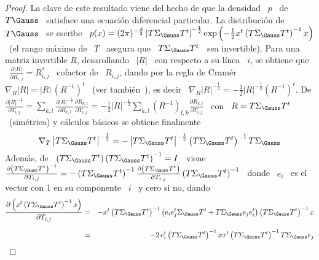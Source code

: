 \begin{proof}
  La clave de este resultado viene del hecho  de que la densidad \ $p$ \ de \ $T
  \Gauss$ \ satisface una ecuaci\'on diferencial particular.
  La   distribuci\'on  de   \  $T   \Gauss$   \  se   escribe  \   $p(x)  =   (2
  \pi)^{-\frac{d}{2}} \left| T \Sigma_\Gauss T^t \right|^{-\frac12} \exp\left( -
    \frac12 x^t \left(  T \Sigma_\Gauss T^t \right)^{-1} x  \right)$ \ (el rango
  m\'aximo de  \ $T$ \  asegura que \  $T \Sigma_\Gauss T^t$ \  sea invertible).
  Para una matriz invertible $R$, desarollando \ $|R|$ \ con respecto a su l\'inea
  \ $i$, se obtiene que  \ $\frac{\partial |R|}{\partial R_{i,j}} = R_{i,j}^*$ \
  cofactor de \ $R_{i,j}$, dando por la  regla de Cram\'er \ $\nabla_R |R| = |R|
  \, \left( R^{-1} \right)^t$ \ (ver tambi\'en~\cite[cap.~1~\&~9]{MagNeu99}), es
  decir  \  $\nabla_R |R|^{-\frac12}  =  -\frac12  |R|^{-\frac12} \left(  R^{-1}
  \right)^t$.  De $\frac{\partial |R|^{-\frac12}}{\partial T_{i,j}} = \sum_{k,l}
  \frac{\partial      |R|^{-\frac12}}{\partial      R_{k,l}}      \frac{\partial
    R_{k,l}}{\partial  T_{i,j}}  =  -\frac12  |R|^{-\frac12}  \sum_{k,l}  \left(
    R^{-1} \right)_{l,k} \frac{\partial R_{k,l}}{\partial T_{i,j}}$ \ con \ $R =
  T  \Sigma_\Gauss  T^t$  \  (sim\'etrica)  y c\'alculos  b\'asicos  se  obtiene
  finalmente
  \[
  \nabla_T  \left|   T  \Sigma_\Gauss  T^t  \right|^{-\frac12}  =   -  \left|  T
    \Sigma_\Gauss T^t \right|^{-\frac12} \left( T \Sigma_\Gauss T^t \right)^{-1}
  T \Sigma_\Gauss
  \]
  Adem\'as, de \ $\left( T  \Sigma_\Gauss T^t \right) \left( T \Sigma_\Gauss T^t
  \right)^{-1}  =  I$ \  viene  \  $\frac{\partial  \left( T  \Sigma_\Gauss  T^t
    \right)^{-1}}{\partial T_{i,j}} = -  \left( T \Sigma_\Gauss T^t \right)^{-1}
  \frac{\partial \left( T \Sigma_\Gauss  T^t \right)}{\partial T_{i,j}} \left( T
    \Sigma_\Gauss T^t \right)^{-1}$ \  donde \ $e_i$ \ es el vector  con 1 en su
  componente \ $i$ \ y cero si no, dando
  \begin{eqnarray*}
  \frac{\partial \left( x^t \left( T \Sigma_\Gauss T^t \right)^{-1} x
  \right)}{\partial T_{i,j}} & = & - x^t \left( T \Sigma_\Gauss T^t \right)^{-1}
  \left( e_i e_j^t \Sigma_\Gauss T^t + T \Sigma_\Gauss e_j e_i^t \right) \left( T
  \Sigma_\Gauss T^t \right)^{-1} x\\[2.5mm]
  & = & - 2 \, e_i^t \left( T \Sigma_\Gauss T^t \right)^{-1} x x^t \left( T
  \Sigma_\Gauss T^t \right)^{-1} T \Sigma_\Gauss e_j

\end{eqnarray*}
\end{proof}
